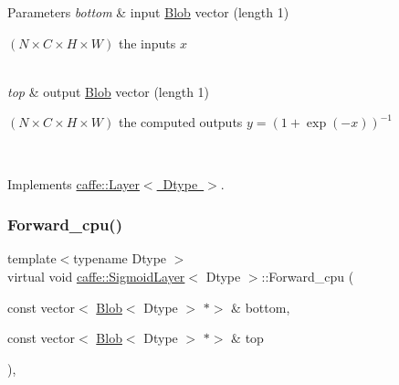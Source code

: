 \begin{DoxyParams}{Parameters}
{\em bottom} & input \mbox{\hyperlink{classcaffe_1_1_blob}{Blob}} vector (length 1)
\begin{DoxyEnumerate}
\item $ (N \times C \times H \times W) $ the inputs $ x $ 
\end{DoxyEnumerate}\\
\hline
{\em top} & output \mbox{\hyperlink{classcaffe_1_1_blob}{Blob}} vector (length 1)
\begin{DoxyEnumerate}
\item $ (N \times C \times H \times W) $ the computed outputs $ y = (1 + \exp(-x))^{-1} $ 
\end{DoxyEnumerate}\\
\hline
\end{DoxyParams}


Implements \mbox{\hyperlink{classcaffe_1_1_layer_a576ac6a60b1e99fe383831f52a6cea77}{caffe\+::\+Layer$<$ Dtype $>$}}.

\mbox{\label{classcaffe_1_1_sigmoid_layer_abcfecf91807cfd75a360e75a22a9de84}} 
\subsubsection{\texorpdfstring{Forward\+\_\+cpu()}{Forward\_cpu()}\hspace{0.1cm}{\footnotesize\ttfamily [2/2]}}
{\footnotesize\ttfamily template$<$typename Dtype $>$ \\
virtual void \mbox{\hyperlink{classcaffe_1_1_sigmoid_layer}{caffe\+::\+Sigmoid\+Layer}}$<$ Dtype $>$\+::Forward\+\_\+cpu (\begin{DoxyParamCaption}\item[{const vector$<$ \mbox{\hyperlink{classcaffe_1_1_blob}{Blob}}$<$ Dtype $>$ $\ast$$>$ \&}]{bottom,  }\item[{const vector$<$ \mbox{\hyperlink{classcaffe_1_1_blob}{Blob}}$<$ Dtype $>$ $\ast$$>$ \&}]{top }\end{DoxyParamCaption})\hspace{0.3cm}{\ttfamily [protected]}, {\ttfamily [virtual]}}


